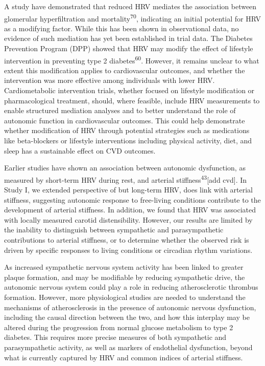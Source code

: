 \documentclass[
  a4paper,
  headsepline=true,
  open=any]{scrbook}
\begin{document}
A study have demonstrated that reduced HRV mediates the association
between glomerular hyperfiltration and mortality\textsuperscript{70},
indicating an initial potential for HRV as a modifying factor. While
this has been shown in observational data, no evidence of such mediation
has yet been established in trial data. The Diabetes Prevention Program
(DPP) showed that HRV may modify the effect of lifestyle intervention in
preventing type 2 diabetes\textsuperscript{60}. However, it remains
unclear to what extent this modification applies to cardiovascular
outcomes, and whether the intervention was more effective among
individuals with lower HRV. Cardiometabolic intervention trials, whether
focused on lifestyle modification or pharmacological treatment, should,
where feasible, include HRV measurements to enable structured mediation
analyses and to better understand the role of autonomic function in
cardiovascular outcomes. This could help demonstrate whether
modification of HRV through potential strategies such as medications
like beta-blockers or lifestyle interventions including physical
activity, diet, and sleep has a sustainable effect on CVD outcomes.

Earlier studies have shown an association between autonomic dysfunction,
as measured by short-term HRV during rest, and arterial
stiffness\textsuperscript{43}{[}add cvd{]}. In Study I, we extended
perspective of but long-term HRV, does link with arterial stiffness,
suggesting autonomic response to free-living conditions contribute to
the development of arterial stiffness. In addition, we found that HRV
was associated with locally measured carotid distensibility. However,
our results are limited by the inability to distinguish between
sympathetic and parasympathetic contributions to arterial stiffness, or
to determine whether the observed risk is driven by specific responses
to living conditions or circadian rhythm variations.

As increased sympathetic nervous system activity has been linked to
greater plaque formation, and may be modifiable by reducing sympathetic
drive, the autonomic nervous system could play a role in reducing
atherosclerotic thrombus formation. However, more physiological studies
are needed to understand the mechanisms of atherosclerosis in the
presence of autonomic nervous dysfunction, including the causal
direction between the two, and how this interplay may be altered during
the progression from normal glucose metabolism to type 2 diabetes. This
requires more precise measures of both sympathetic and parasympathetic
activity, as well as markers of endothelial dysfunction, beyond what is
currently captured by HRV and common indices of arterial stiffness.
\end{document}
